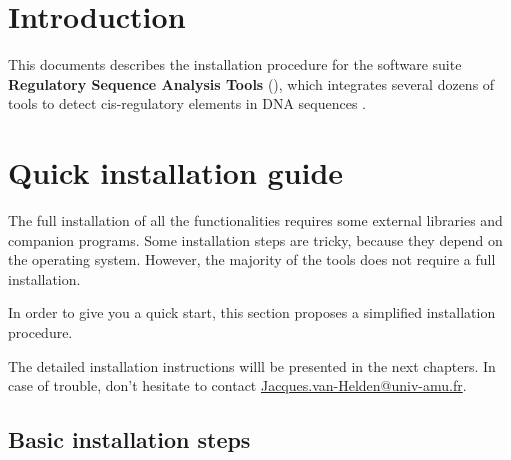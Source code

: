 \documentclass[12pt,a4paper, oneside]{scrreprt} %
\begin{document}


\newpage
\tableofcontents
\newpage

\chapter{Introduction}

This documents describes the installation procedure for the software
suite \textbf{Regulatory Sequence Analysis Tools} (\RSAT), which
integrates several dozens of tools to detect cis-regulatory elements
in DNA sequences
\cite{Thomas-Chollier:2011:W86-91,Thomas-Chollier:2008:W119-27,vanHelden:2003:3593-6,vanHelden:2000:177-87}.

\chapter{Quick installation guide}

The full installation of all the \RSAT functionalities requires some
external libraries and companion programs. Some installation steps are
tricky, because they depend on the operating system. However, the
majority of the tools does not require a full installation.

In order to give you a quick start, this section proposes a simplified
installation procedure.

The detailed installation instructions willl be presented in the next
chapters. In case of trouble, don't hesitate to contact
\href{mailto:me@example.com}{Jacques.van-Helden@univ-amu.fr}.

\section{Basic installation steps}
\end{document}
